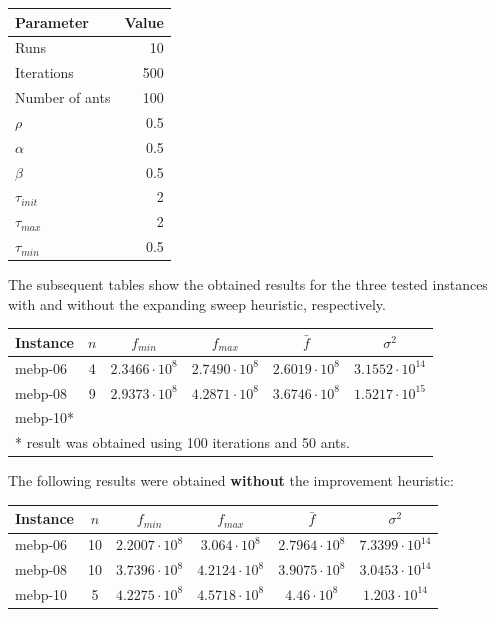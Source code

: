 \documentclass{article}
\theoremstyle{definition}
\begin{document}
\begin{center}
\begin{tabular}{|l|r|}
	\hline
	\textbf{Parameter} & \textbf{Value} \\
	\hline
	Runs & 10 \\
	\hline
	Iterations & 500 \\
	\hline
	Number of ants & 100 \\
	\hline
	$\rho$ & 0.5 \\
	\hline
	$\alpha$ & 0.5 \\
	\hline
	$\beta$ & 0.5 \\
	\hline
	$\tau_{init}$ & 2 \\
	\hline
	$\tau_{max}$ & 2 \\
	\hline
	$\tau_{min}$ & 0.5 \\
	\hline
\end{tabular}
\end{center}
The subsequent tables show the obtained results for the three tested instances with and without the expanding sweep heuristic, respectively.
\begin{center}
\begin{tabular}{|l|c|c|c|c|c|}
	\hline
	\textbf{Instance} & \footnotesize $n$ & \footnotesize $f_{min}$ & \footnotesize $f_{max}$ & \footnotesize $\bar f$ & \footnotesize $\sigma^{2}$ \\
	\hline
	mebp-06 & 4 & $2.3466\cdot10^{8}$ & $2.7490\cdot10^{8}$ & $2.6019\cdot10^{8}$ & $3.1552\cdot10^{14}$ \\
	\hline
	mebp-08 & 9 & $2.9373\cdot10^{8}$ & $4.2871\cdot10^{8}$ & $3.6746\cdot10^{8}$ & $1.5217\cdot10^{15}$ \\
	\hline
	mebp-10* & & & & \\
	\hline
	\multicolumn{6}{|l|}{* result was obtained using 100 iterations and 50 ants.} \\
	\hline
\end{tabular}
\end{center}
The following results were obtained \textbf{without} the improvement heuristic:

\begin{center}
\begin{tabular}{|l|c|c|c|c|c|}
	\hline
	\textbf{Instance} & \footnotesize $n$ & \footnotesize $f_{min}$ & \footnotesize $f_{max}$ & \footnotesize $\bar f$ & \footnotesize $\sigma^{2}$ \\
	\hline
	mebp-06 & 10 & $2.2007\cdot10^{8}$ & $3.064\cdot10^{8}$ & $2.7964\cdot10^{8}$ & $7.3399\cdot10^{14}$ \\
	\hline
	mebp-08 & 10 & $3.7396\cdot10^{8}$ & $4.2124\cdot10^{8}$ & $3.9075\cdot10^{8}$ & $3.0453\cdot10^{14}$ \\
	\hline
	mebp-10 & 5 & $4.2275\cdot10^{8}$ & $4.5718\cdot10^{8}$ & $4.46\cdot10^{8}$ & $1.203\cdot10^{14}$ \\
	\hline
\end{tabular}
\end{center}
\end{document}

